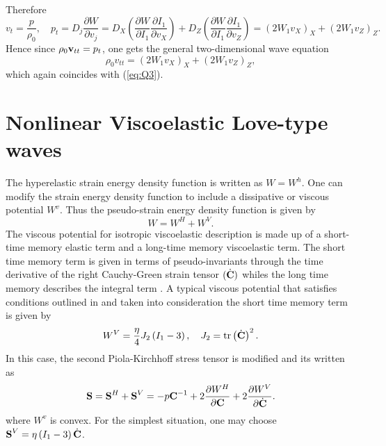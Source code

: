 \documentclass[11pt,letter,subeqn,fleqn]{article}
\numberwithin{equation}{section}
\numberwithin{table}{section}
\numberwithin{figure}{section}
\def\vec#1{{\boldsymbol{\rm #1}}} %
\def\vec#1{{\boldsymbol{\rm #1}}} %
\begin{document}
	Therefore
	\begin{equation}\label{15}
	{v}_{t}=\frac{{p}}{\rho_{0}},\quad {p}_{t}=D_{j}\frac{\partial W}{\partial {v_{j}}}=D_{X}\left(\frac{\partial W}{\partial {I_{1}}}\frac{\partial I_{1}}{\partial {v_{X}}}\right)+D_{Z}\left(\frac{\partial W}{\partial {I_{1}}}\frac{\partial I_{1}}{\partial {v_{Z}}}\right)=\left(2W_{1}v_{X}\right)_{X}+\left(2W_{1}v_{Z}\right)_{Z}.
	\end{equation}
	Hence since $\rho_{0}\vec{v}_{tt}={p_{t}}$, one gets the general two-dimensional wave equation
	\begin{equation}\label{c16}
	\rho_{0}{v}_{tt}=\left(2W_{1}v_{X}\right)_{X}+\left(2W_{1}v_{Z}\right)_{Z},
	\end{equation}
which again coincides with (\ref{eq:Q3}).


\section{Nonlinear Viscoelastic Love-type waves}\label{sec:4:NonlinearViscoelasticLW}
The hyperelastic strain energy density function is written as $W=W^{h}$. One can modify the strain energy density function to include a dissipative or viscous potential $W^{v}$. Thus the pseudo-strain energy density function is given by
\begin{equation}\label{1}
W=W^{H}+W^{V}.
\end{equation}
The viscous potential for isotropic viscoelastic description is made up of a short-time memory elastic term and a long-time memory viscoelastic term. The short time memory term is given in terms of pseudo-invariants through the time derivative of the right Cauchy-Green strain tensor $(\dot{\vec{C}})$ whiles the long time memory describes the integral term \cite{pioletti2000non}. A typical viscous potential that satisfies conditions outlined in \cite{pioletti2000non} and taken into consideration the short time memory term is given by
\begin{equation}\label{2}
W^{V}=\frac{\eta}{4}J_{2}\left(I_{1}-3\right), \quad J_{2}=\mathrm{tr}\left(\dot{\vec{C}}\right)^{2}.
\end{equation}
In this case, the second Piola-Kirchhoff stress tensor is modified and its written as
\begin{equation}\label{3}
\vec{S}=\vec{S}^{H}+\vec{S}^{V}=-p\vec{C}^{-1}+2\frac{\partial W^{H}}{\partial \vec{C}}+2\frac{\partial W^{V}}{\partial \dot{\vec{C}}}.
\end{equation}	
where $W^{v}$ is convex. For the simplest situation, one may choose $\vec{S}^{V}=\eta\left(I_{1}-3\right)\dot{\vec{C}}$.
\end{document}
